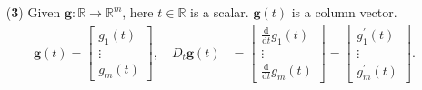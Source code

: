 \documentclass[12pt,thmsa]{article}
\begin{document}
\begin{itemize}
	\item[({\bf{3}})] Given \(\boldsymbol{g}: \mathbb{R} \rightarrow \mathbb{R}^m \), here \(t \in \mathbb{R} \) is a scalar. \(\boldsymbol{g}(t)\) is a column vector.
	\[
	\begin{aligned}
		\boldsymbol{g}(t) =
		\left[
		\begin{array}{c}
			g_{1}(t) \\
			\vdots \\
			g_{m}(t)
		\end{array}
		\right], \quad
		D_{t} \boldsymbol{g}(t) & =\left[
		\begin{aligned}
			\frac{\mathrm{d}}{\mathrm{d} t}g_{1}(t) \\
			\vdots \qquad \\
			\frac{\mathrm{d}}{\mathrm{d} t}g_{m}(t)
		\end{aligned}
		\right] =\left[\begin{array}{c}
			g_{1}^{\prime}(t) \\
			\vdots \\
			g_{m}^{\prime}(t)
		\end{array}\right].  \\
	\end{aligned}
	\]


\end{itemize}
\end{document}
